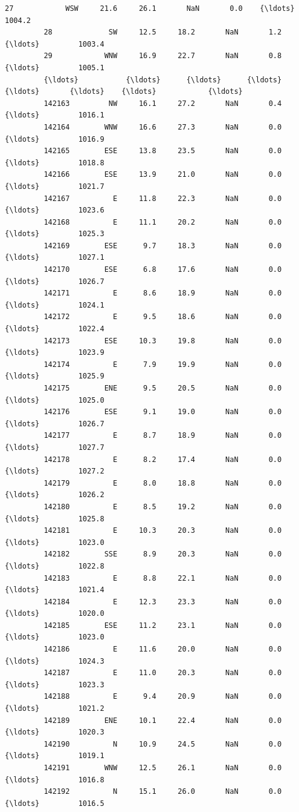 \documentclass[11pt]{article}
\begin{document}
\begin{Verbatim}[commandchars=\\\{\}]
         27            WSW     21.6     26.1       NaN       0.0    {\ldots}         1004.2   
         28             SW     12.5     18.2       NaN       1.2    {\ldots}         1003.4   
         29            WNW     16.9     22.7       NaN       0.8    {\ldots}         1005.1   
         {\ldots}           {\ldots}      {\ldots}      {\ldots}       {\ldots}       {\ldots}    {\ldots}            {\ldots}   
         142163         NW     16.1     27.2       NaN       0.4    {\ldots}         1016.1   
         142164        WNW     16.6     27.3       NaN       0.0    {\ldots}         1016.9   
         142165        ESE     13.8     23.5       NaN       0.0    {\ldots}         1018.8   
         142166        ESE     13.9     21.0       NaN       0.0    {\ldots}         1021.7   
         142167          E     11.8     22.3       NaN       0.0    {\ldots}         1023.6   
         142168          E     11.1     20.2       NaN       0.0    {\ldots}         1025.3   
         142169        ESE      9.7     18.3       NaN       0.0    {\ldots}         1027.1   
         142170        ESE      6.8     17.6       NaN       0.0    {\ldots}         1026.7   
         142171          E      8.6     18.9       NaN       0.0    {\ldots}         1024.1   
         142172          E      9.5     18.6       NaN       0.0    {\ldots}         1022.4   
         142173        ESE     10.3     19.8       NaN       0.0    {\ldots}         1023.9   
         142174          E      7.9     19.9       NaN       0.0    {\ldots}         1025.9   
         142175        ENE      9.5     20.5       NaN       0.0    {\ldots}         1025.0   
         142176        ESE      9.1     19.0       NaN       0.0    {\ldots}         1026.7   
         142177          E      8.7     18.9       NaN       0.0    {\ldots}         1027.7   
         142178          E      8.2     17.4       NaN       0.0    {\ldots}         1027.2   
         142179          E      8.0     18.8       NaN       0.0    {\ldots}         1026.2   
         142180          E      8.5     19.2       NaN       0.0    {\ldots}         1025.8   
         142181          E     10.3     20.3       NaN       0.0    {\ldots}         1023.0   
         142182        SSE      8.9     20.3       NaN       0.0    {\ldots}         1022.8   
         142183          E      8.8     22.1       NaN       0.0    {\ldots}         1021.4   
         142184          E     12.3     23.3       NaN       0.0    {\ldots}         1020.0   
         142185        ESE     11.2     23.1       NaN       0.0    {\ldots}         1023.0   
         142186          E     11.6     20.0       NaN       0.0    {\ldots}         1024.3   
         142187          E     11.0     20.3       NaN       0.0    {\ldots}         1023.3   
         142188          E      9.4     20.9       NaN       0.0    {\ldots}         1021.2   
         142189        ENE     10.1     22.4       NaN       0.0    {\ldots}         1020.3   
         142190          N     10.9     24.5       NaN       0.0    {\ldots}         1019.1   
         142191        WNW     12.5     26.1       NaN       0.0    {\ldots}         1016.8   
         142192          N     15.1     26.0       NaN       0.0    {\ldots}         1016.5   
         

\end{Verbatim}
\end{document}
